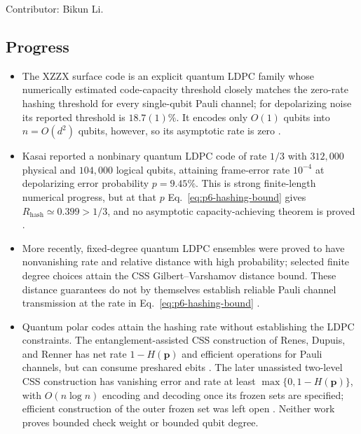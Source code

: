 Contributor: Bikun Li.

\subsection*{Progress}

\begin{itemize}
  \item The XZZX surface code is an explicit quantum LDPC family whose
  numerically estimated code-capacity threshold closely matches the zero-rate
  hashing threshold for every single-qubit Pauli channel; for depolarizing
  noise its reported threshold is $18.7(1)\%$.  It encodes only $O(1)$ qubits
  into $n=O(d^2)$ qubits, however, so its asymptotic rate is zero
  .

  \item Kasai reported a nonbinary quantum LDPC code of rate $1/3$ with
  $312{,}000$ physical and $104{,}000$ logical qubits, attaining frame-error
  rate $10^{-4}$ at depolarizing error probability $p=9.45\%$.  This is strong
  finite-length numerical progress, but at that $p$ Eq.~\eqref{eq:p6-hashing-bound}
  gives $R_{\mathrm{hash}}\simeq0.399>1/3$, and no asymptotic
  capacity-achieving theorem is proved
  .

  \item More recently, fixed-degree quantum LDPC ensembles were proved to have
  nonvanishing rate and relative distance with high probability; selected
  finite degree choices attain the CSS Gilbert--Varshamov distance bound.
  These distance guarantees do not by themselves establish reliable Pauli
  channel transmission at the rate in Eq.~\eqref{eq:p6-hashing-bound}
  .

  \item Quantum polar codes attain the hashing rate without establishing the
  LDPC constraints.  The entanglement-assisted CSS construction of Renes,
  Dupuis, and Renner has net rate $1-H(\mathbf p)$ and efficient operations
  for Pauli channels, but can consume preshared ebits
  .  The later unassisted two-level CSS
  construction has vanishing error and rate at least
  $\max\{0,1-H(\mathbf p)\}$, with $O(n\log n)$ encoding and decoding once
  its frozen sets are specified; efficient construction of the outer frozen
  set was left open .  Neither work
  proves bounded check weight or bounded qubit degree.
\end{itemize}

